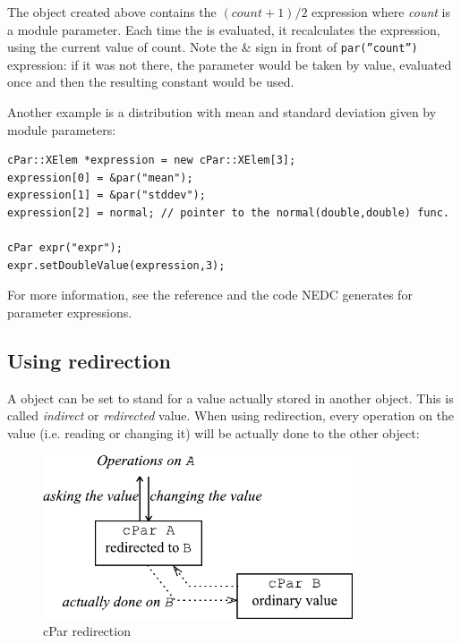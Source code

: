 The  object created above contains the $(count+1)/2$
expression where \textit{count} is a module parameter. Each time the
 is evaluated, it recalculates the expression, using the
current value of count. Note the \& sign in front of
\texttt{par(''count'')} expression: if it was not there, the parameter
would be taken by value, evaluated once and
then the resulting constant would be used.

Another example is a distribution with mean and
standard deviation given by module parameters:

\begin{verbatim}
cPar::XElem *expression = new cPar::XElem[3];
expression[0] = &par("mean");
expression[1] = &par("stddev");
expression[2] = normal; // pointer to the normal(double,double) func.

cPar expr("expr");
expr.setDoubleValue(expression,3);
\end{verbatim}


For more information, see the reference and the code NEDC generates
for parameter expressions.



\subsection{Using redirection}

A  object can be set to stand for a value actually stored
in another  object. This is called \textit{indirect} or
\textit{redirected} value. When using redirection,
every operation on the value (i.e.  reading or changing it) will be
actually done to the other  object:

\begin{figure}[htbp]
  \begin{center}
    \includegraphics[width=3.608in, height=1.908in]{figures/usmanFig11}
    \caption{cPar redirection}
    \label{fig:ch-sim-lib:cPar-redirection}
  \end{center}
\end{figure}

